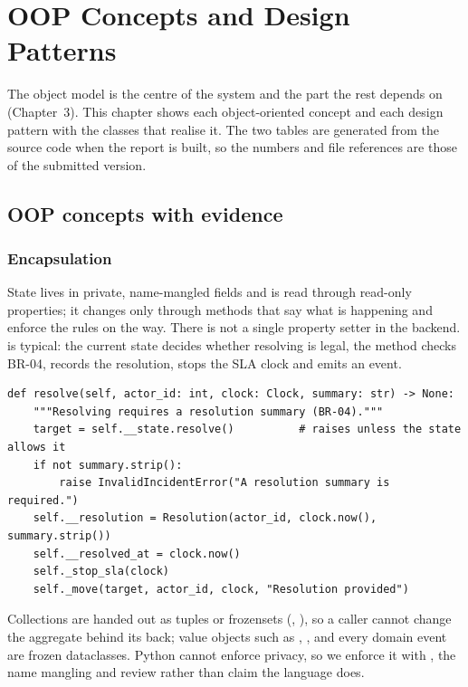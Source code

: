 \chapter{OOP Concepts and Design Patterns}\label{ch:oop}

The object model is the centre of the system and the part the rest depends on (Chapter~3). This
chapter shows each object-oriented concept and each design pattern with the classes that
realise it. The two tables are generated from the source code when the report is built, so the
numbers and file references are those of the submitted version.

\lstset{language=Python,basicstyle=\ttfamily\small,columns=fullflexible,frame=single,
  keywordstyle=\bfseries,showstringspaces=false,xleftmargin=4pt,xrightmargin=4pt}

\section{OOP concepts with evidence}


\subsection*{Encapsulation}
State lives in private, name-mangled fields and is read through read-only properties; it changes
only through methods that say what is happening and enforce the rules on the way. There is not
a single property setter in the backend.  is typical: the current state
decides whether resolving is legal, the method checks BR-04, records the resolution, stops the
SLA clock and emits an event.
\begin{lstlisting}
def resolve(self, actor_id: int, clock: Clock, summary: str) -> None:
    """Resolving requires a resolution summary (BR-04)."""
    target = self.__state.resolve()          # raises unless the state allows it
    if not summary.strip():
        raise InvalidIncidentError("A resolution summary is required.")
    self.__resolution = Resolution(actor_id, clock.now(), summary.strip())
    self.__resolved_at = clock.now()
    self._stop_sla(clock)
    self._move(target, actor_id, clock, "Resolution provided")
\end{lstlisting}
Collections are handed out as tuples or frozensets (, ),
so a caller cannot change the aggregate behind its back; value objects such as
, ,  and every domain event are frozen
dataclasses. Python cannot enforce privacy, so we enforce it with , the
name mangling and review rather than claim the language does.


